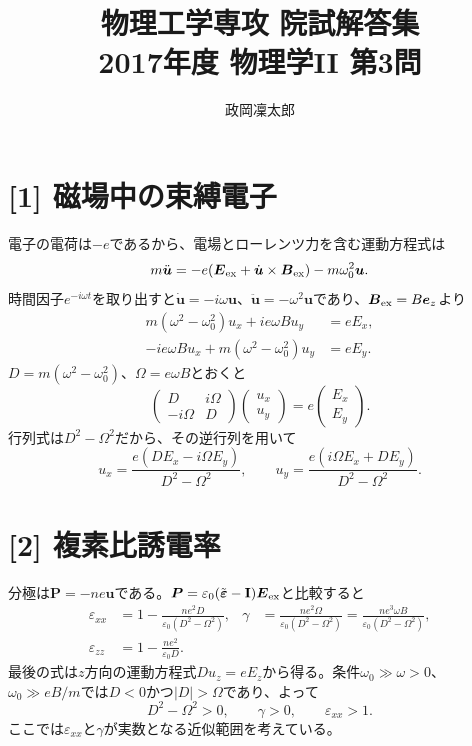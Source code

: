 \documentclass[11pt,a4paper]{article}
\title{物理工学専攻 院試解答集\\2017年度 物理学II 第3問}
\author{政岡凜太郎}
\date{}
\begin{document}
\maketitle

\section*{[1] 磁場中の束縛電子}
電子の電荷は$-e$であるから、電場とローレンツ力を含む運動方程式は
\begin{equation}
 m\ddot{\boldsymbol u}=-e(\boldsymbol E_{\rm ex}+\dot{\boldsymbol u}\times\boldsymbol B_{\rm ex})-m\omega_0^2\boldsymbol u.
\end{equation}
時間因子$e^{-i\omega t}$を取り出すと$\dot{\boldsymbol u}=-i\omega\boldsymbol u$、$\ddot{\boldsymbol u}=-\omega^2\boldsymbol u$であり、$\boldsymbol B_{\rm ex}=B\boldsymbol e_z$より
\begin{align}
 m(\omega^2-\omega_0^2)u_x+i e\omega B u_y&=eE_x,\\
 -i e\omega B u_x+m(\omega^2-\omega_0^2)u_y&=eE_y.
\end{align}
$D=m(\omega^2-\omega_0^2)$、$\Omega=e\omega B$とおくと
\begin{equation}
 \begin{pmatrix}D&i\Omega\\-i\Omega&D\end{pmatrix}
 \begin{pmatrix}u_x\\u_y\end{pmatrix}
 =e\begin{pmatrix}E_x\\E_y\end{pmatrix}.
\end{equation}
行列式は$D^2-\Omega^2$だから、その逆行列を用いて
\begin{equation}
 \boxed{u_x=\frac{e(DE_x-i\Omega E_y)}{D^2-\Omega^2},\qquad
 u_y=\frac{e(i\Omega E_x+DE_y)}{D^2-\Omega^2}}.
\end{equation}

\section*{[2] 複素比誘電率}
分極は$\boldsymbol P=-ne\boldsymbol u$である。$\boldsymbol P=\varepsilon_0(\tilde{\boldsymbol\varepsilon}-\mathbf I)\boldsymbol E_{\rm ex}$と比較すると
\begin{align}
 \varepsilon_{xx}&=1-\frac{ne^2D}{\varepsilon_0(D^2-\Omega^2)},&
 \gamma&=\frac{ne^2\Omega}{\varepsilon_0(D^2-\Omega^2)}
 =\frac{ne^3\omega B}{\varepsilon_0(D^2-\Omega^2)},\\
 \varepsilon_{zz}&=1-\frac{ne^2}{\varepsilon_0D}.
\end{align}
最後の式は$z$方向の運動方程式$D u_z=eE_z$から得る。条件$\omega_0\gg\omega>0$、$\omega_0\gg eB/m$では$D<0$かつ$|D|>\Omega$であり、よって
\begin{equation}
 D^2-\Omega^2>0,\qquad \gamma>0,\qquad \varepsilon_{xx}>1.
\end{equation}
ここでは$\varepsilon_{xx}$と$\gamma$が実数となる近似範囲を考えている。
\end{document}
